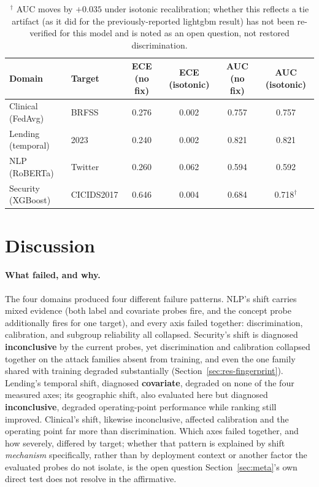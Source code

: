 \documentclass[11pt]{article}
\begin{document}
\begin{table}[t]
\centering
\caption{Remediation ladder (isotonic recalibration on 10\% target labels), source-only primary
models. ECE falls sharply in every domain; AUC is essentially unchanged except security.}
\label{tab:remediation}
\small
\begin{tabular}{llcccc}
\toprule
Domain & Target & ECE (no fix) & ECE (isotonic) & AUC (no fix) & AUC (isotonic) \\
\midrule
Clinical (FedAvg) & BRFSS & 0.276 & 0.002 & 0.757 & 0.757 \\
Lending (temporal) & 2023 & 0.240 & 0.002 & 0.821 & 0.821 \\
NLP (RoBERTa) & Twitter & 0.260 & 0.062 & 0.594 & 0.592 \\
Security (XGBoost) & CICIDS2017 & 0.646 & 0.004 & 0.684 & 0.718$^{\dagger}$ \\
\bottomrule
\end{tabular}
\captionsetup{font=footnotesize}
\caption*{$^{\dagger}$ AUC moves by $+0.035$ under isotonic recalibration; whether this reflects a
tie artifact (as it did for the previously-reported lightgbm result) has not been re-verified for
this model and is noted as an open question, not restored discrimination.}
\end{table}

\section{Discussion}\label{sec:discussion}

\paragraph{What failed, and why.} The four domains produced four different failure patterns. NLP's
shift carries mixed evidence (both label and covariate probes fire, and the concept probe
additionally fires for one target), and every axis failed together: discrimination, calibration,
and subgroup reliability all collapsed. Security's shift is diagnosed \textbf{inconclusive} by the
current probes, yet discrimination and calibration collapsed together on the attack families absent
from training, and even the one family shared with training degraded substantially
(Section~\ref{sec:res-fingerprint}). Lending's temporal shift, diagnosed \textbf{covariate}, degraded
on none of the four measured axes; its geographic shift, also evaluated here but diagnosed
\textbf{inconclusive}, degraded operating-point performance while ranking still improved. Clinical's
shift, likewise inconclusive, affected calibration and the operating point far more than
discrimination. Which axes failed together, and how severely, differed by target; whether that
pattern is explained by shift \emph{mechanism} specifically, rather than by deployment context or
another factor the evaluated probes do not isolate, is the open question Section~\ref{sec:meta}'s
own direct test does not resolve in the affirmative.
\end{document}
